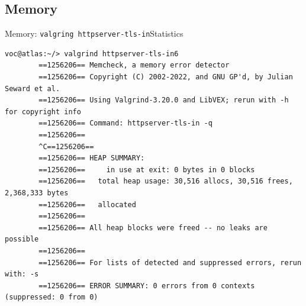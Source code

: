 ﻿\subsection{Memory}

\begin{frame}[fragile]{Memory: \texttt{valgring httpserver-tls-in}}{Statistics}
\begin{center}
    \begin{BVerbatim}[gobble=8, fontsize=\small]
        voc@atlas:~/> valgrind httpserver-tls-in6
        ==1256206== Memcheck, a memory error detector
        ==1256206== Copyright (C) 2002-2022, and GNU GP'd, by Julian Seward et al.
        ==1256206== Using Valgrind-3.20.0 and LibVEX; rerun with -h for copyright info
        ==1256206== Command: httpserver-tls-in -q
        ==1256206==
        ^C==1256206==
        ==1256206== HEAP SUMMARY:
        ==1256206==     in use at exit: 0 bytes in 0 blocks
        ==1256206==   total heap usage: 30,516 allocs, 30,516 frees, 2,368,333 bytes
        ==1256206==   allocated
        ==1256206==
        ==1256206== All heap blocks were freed -- no leaks are possible
        ==1256206==
        ==1256206== For lists of detected and suppressed errors, rerun with: -s
        ==1256206== ERROR SUMMARY: 0 errors from 0 contexts (suppressed: 0 from 0)
    \end{BVerbatim}
\end{center}
\end{frame}

